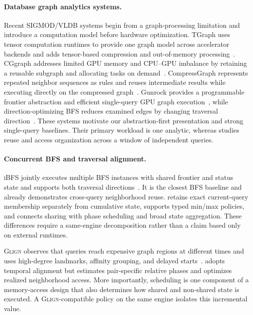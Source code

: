 \paragraph{Database graph analytics systems.}
Recent SIGMOD/VLDB systems begin from a graph-processing limitation and introduce a computation model before hardware optimization.  TGraph uses tensor computation runtimes to provide one graph model across accelerator backends and adds tensor-based compression and out-of-memory processing~\cite{zhang_tgraph_2025}.  CGgraph addresses limited GPU memory and CPU--GPU imbalance by retaining a reusable subgraph and allocating tasks on demand~\cite{cui_cggraph_2024}.  CompressGraph represents repeated neighbor sequences as rules and reuses intermediate results while executing directly on the compressed graph~\cite{chen_compressgraph_2023}.  Gunrock provides a programmable frontier abstraction and efficient single-query GPU graph execution~\cite{wang_gunrock_2016}, while direction-optimizing BFS reduces examined edges by changing traversal direction~\cite{beamer_direction_2013}.  These systems motivate our abstraction-first presentation and strong single-query baselines.  Their primary workload is one analytic, whereas \system studies reuse and access organization across a window of independent queries.

\paragraph{Concurrent BFS and traversal alignment.}
\textsc{iBFS} jointly executes multiple BFS instances with shared frontier and status state and supports both traversal directions~\cite{liu_ibfs_2016}.  It is the closest BFS baseline and already demonstrates cross-query neighborhood reuse.  \system retains exact current-query membership separately from cumulative state, supports typed min/max policies, and connects sharing with phase scheduling and broad state aggregation.  These differences require a same-engine decomposition rather than a claim based only on external runtimes.

\textsc{Glign} observes that queries reach expensive graph regions at different times and uses high-degree landmarks, affinity grouping, and delayed starts~\cite{yin_glign_2022}.  \system adopts temporal alignment but estimates pair-specific relative phases and optimizes realized neighborhood access.  More importantly, scheduling is one component of a memory-access design that also determines how shared and non-shared state is executed.  A \textsc{Glign}-compatible policy on the same engine isolates this incremental value.

